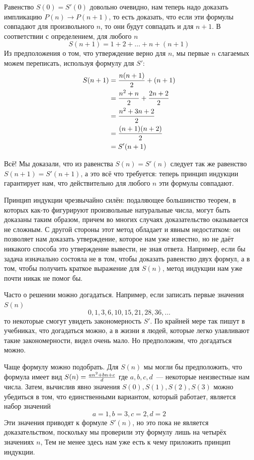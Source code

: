 Равенство $S(0) = S'(0)$ довольно очевидно, нам теперь надо доказать импликацию $P(n)\to P(n + 1)$, то есть доказать, что если эти формулы совпадают для произвольного $n$, то они будут совпадать и для $n + 1$. В соответствии с определением, для любого $n$
$$S(n + 1) = 1 + 2 + \ldots + n + (n + 1)$$
Из предположения о том, что утверждение верно для $n$, мы первые $n$ слагаемых можем переписать, используя формулу для $S'$:
\begin{align*}
S(n + 1) &= {n(n + 1)\over 2} + (n + 1)\\
	&= {n^2 + n\over 2} + {2n + 2\over 2} \\
	&= {n^ 2 + 3n + 2 \over 2} \\
	&= {(n + 1)(n + 2)\over 2} \\
	&= {S'(n + 1)}
\end{align*}

Всё! Мы доказали, что из равенства $S(n)=S'(n)$ следует так же равенство $S(n+1)=S'(n+1)$, а это всё что требуется: теперь принцип индукции гарантирует нам, что действительно для любого $n$ эти формулы совпадают.

Принцип индукции чрезвычайно силён: подаляющее большинство теорем, в которых как-то фигурируют произвольные натуральные числа, могут быть доказаны таким образом, причем во многих случаях доказательство оказывается не сложным. С другой стороны этот метод обладает и явным недостатком: он позволяет нам доказать утверждение, которое нам уже известно, но не даёт никакого способа это утверждение вывести, не зная ответа. Например, если бы задача изначально состояла не в том, чтобы доказать равенство двух формул, а в том, чтобы получить краткое выражение для $S(n)$, метод индукции нам уже почти никак не помог бы.

Часто о решении можно догадаться. Например, если записать первые значения $S(n)$
$$0, 1, 3, 6, 10, 15, 21, 28, 36, \ldots$$
то некоторые смогут увидеть закономерность $S'$. По крайней мере так пишут в учебниках, что догадаться можно, а в жизни я людей, которые легко улавливают такие закономерности, видел очень мало. Но предположим, что догадаться можно.

Чаще формулу можно подобрать. Для $S(n)$ мы могли бы предположить, что формула имеет вид
$S(n) = {an^2 + bn + c\over d}$
где $a, b, c, d$~--- некоторые неизвестные нам числа. Затем, вычислив явно значения $S(0), S(1), S(2), S(3)$ можно убедиться в том, что единственными вариантом, который работает, является набор значений
$$a=1, b=3, c=2, d=2$$
Эти значения приводят к формуле $S'(n)$, но это пока не является доказательством, поскольку мы проверили эту формулу лишь на четырёх значениях $n$, Тем не менее здесь нам уже есть к чему приложить принцип индукции.

